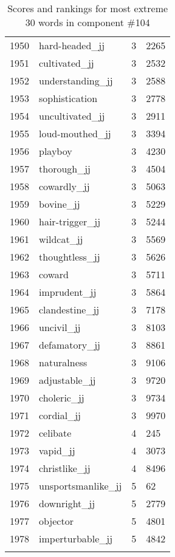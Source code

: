 \begin{longtable}[!htbp]{| rlr@{.}l |}
    1950 & hard-headed\_jj & 3 & 2265 \\
    1951 & cultivated\_jj & 3 & 2532 \\
    1952 & understanding\_jj & 3 & 2588 \\
    1953 & sophistication & 3 & 2778 \\
    1954 & uncultivated\_jj & 3 & 2911 \\
    1955 & loud-mouthed\_jj & 3 & 3394 \\
    1956 & playboy & 3 & 4230 \\
    1957 & thorough\_jj & 3 & 4504 \\
    1958 & cowardly\_jj & 3 & 5063 \\
    1959 & bovine\_jj & 3 & 5229 \\
    1960 & hair-trigger\_jj & 3 & 5244 \\
    1961 & wildcat\_jj & 3 & 5569 \\
    1962 & thoughtless\_jj & 3 & 5626 \\
    1963 & coward & 3 & 5711 \\
    1964 & imprudent\_jj & 3 & 5864 \\
    1965 & clandestine\_jj & 3 & 7178 \\
    1966 & uncivil\_jj & 3 & 8103 \\
    1967 & defamatory\_jj & 3 & 8861 \\
    1968 & naturalness & 3 & 9106 \\
    1969 & adjustable\_jj & 3 & 9720 \\
    1970 & choleric\_jj & 3 & 9734 \\
    1971 & cordial\_jj & 3 & 9970 \\
    1972 & celibate & 4 & 245 \\
    1973 & vapid\_jj & 4 & 3073 \\
    1974 & christlike\_jj & 4 & 8496 \\
    1975 & unsportsmanlike\_jj & 5 & 62 \\
    1976 & downright\_jj & 5 & 2779 \\
    1977 & objector & 5 & 4801 \\
    1978 & imperturbable\_jj & 5 & 4842 \\
    \hline
    \caption{Scores and rankings for most extreme 30 words in component \#104} \\
\end{longtable}
